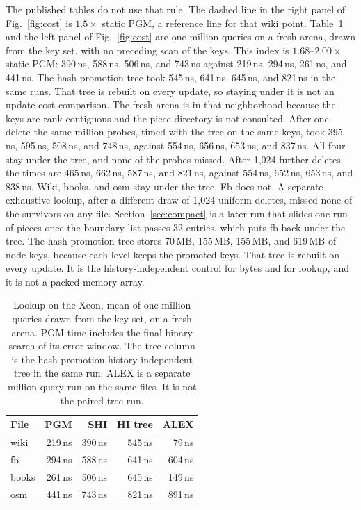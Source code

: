 \documentclass[conference]{IEEEtran}
\begin{document}
The published tables do not use that rule.
The dashed line in the right panel of Fig.~\ref{fig:cost} is $1.5\times$ static PGM, a reference line for that wiki point.
Table~\ref{tab:lookup} and the left panel of Fig.~\ref{fig:cost} are one million queries on a fresh arena, drawn from the key set, with no preceding scan of the keys.
This index is $1.68$--$2.00\times$ static PGM: 390\,ns, 588\,ns, 506\,ns, and 743\,ns against 219\,ns, 294\,ns, 261\,ns, and 441\,ns.
The hash-promotion tree took 545\,ns, 641\,ns, 645\,ns, and 821\,ns in the same runs.
That tree is rebuilt on every update, so staying under it is not an update-cost comparison.
The fresh arena is in that neighborhood because the keys are rank-contiguous and the piece directory is not consulted.
After one delete the same million probes, timed with the tree on the same keys, took 395\,ns, 595\,ns, 508\,ns, and 748\,ns, against 554\,ns, 656\,ns, 653\,ns, and 837\,ns.
All four stay under the tree, and none of the probes missed.
After 1{,}024 further deletes the times are 465\,ns, 662\,ns, 587\,ns, and 821\,ns, against 554\,ns, 652\,ns, 653\,ns, and 838\,ns.
Wiki, books, and osm stay under the tree.
Fb does not.
A separate exhaustive lookup, after a different draw of 1{,}024 uniform deletes, missed none of the survivors on any file.
Section~\ref{sec:compact} is a later run that slides one run of pieces once the boundary list passes 32 entries, which puts fb back under the tree.
The hash-promotion tree stores 70\,MB, 155\,MB, 155\,MB, and 619\,MB of node keys, because each level keeps the promoted keys.
That tree is rebuilt on every update.
It is the history-independent control for bytes and for lookup, and it is not a packed-memory array.

\begin{table}[t]
\caption{Lookup on the Xeon, mean of one million queries drawn from the key set, on a fresh arena.
PGM time includes the final binary search of its error window.
The tree column is the hash-promotion history-independent tree in the same run.
ALEX is a separate million-query run on the same files.
It is not the paired tree run.}
\label{tab:lookup}
\centering
\footnotesize
\begin{tabular}{@{}lrrrr@{}}
\toprule
File & PGM & SHI & HI tree & ALEX \\
\midrule
wiki  & 219\,ns & 390\,ns & 545\,ns & 79\,ns \\
fb    & 294\,ns & 588\,ns & 641\,ns & 604\,ns \\
books & 261\,ns & 506\,ns & 645\,ns & 149\,ns \\
osm   & 441\,ns & 743\,ns & 821\,ns & 891\,ns \\
\bottomrule
\end{tabular}
\end{table}
\end{document}
